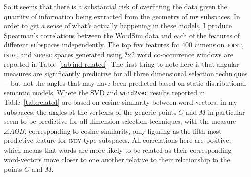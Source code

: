 So it seems that there is a substantial risk of overfitting the data given the quantity of information being extracted from the geometry of my subspaces.  In order to get a sense of what's actually happening in these models, I produce Spearman's correlations between the WordSim data and each of the features of different subspaces independently.  The top five features for 400 dimension \textsc{joint}, \textsc{indy}, and \textsc{zipped} spaces generated using 2x2 word co-occurrence windows are reported in Table~\ref{tab:ind-related}.  The first thing to note here is that angular measures are significantly predictive for all three dimensional selection techniques---but not the angles that may have been predicted based on static distributional semantic models.  Where the SVD and \texttt{word2vec} results reported in Table~\ref{tab:related} are based on cosine similarity between word-vectors, in my subspaces, the angles at the vertexes of the generic points $C$ and $M$ in particular seem to be predictive for all dimension selection techniques, with the measure $\angle AOB$, corresponding to cosine similarity, only figuring as the fifth most predictive feature for \textsc{indy} type subspaces.  All correlations here are positive, which means that words are more likely to be related as their corresponding word-vectors move closer to one another relative to their relationship to the points $C$ and $M$.


